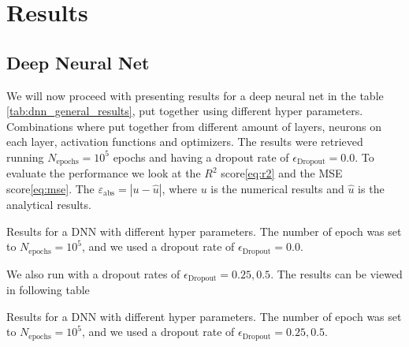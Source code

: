 \section{Results}


\subsection{Deep Neural Net}
We will now proceed with presenting results for a deep neural net in the table \ref{tab:dnn_general_results}, put together using different hyper parameters. Combinations where put together from different amount of layers, neurons on each layer, activation functions and optimizers. The results were retrieved running $N_\mathrm{epochs}=10^5$ epochs and having a dropout rate of $\epsilon_\mathrm{Dropout}=0.0$. To evaluate the performance we look at the $R^2$ score\eqref{eq:r2} and the MSE score\eqref{eq:mse}. The $\varepsilon_{\mathrm{abs}}=|u - \hat{u}|$, where $u$ is the numerical results and $\hat{u}$ is the analytical results.
\begin{table}[h!tb]
    \centering
    \caption{Results for a DNN with different hyper parameters. The number of epoch was set to $N_\mathrm{epochs}=10^5$, and we used a dropout rate of $\epsilon_\mathrm{Dropout}=0.0$. }
    \label{tab:dnn_general_results}
\end{table}

We also run with a dropout rates of $\epsilon_\mathrm{Dropout}=0.25, 0.5$. The results can be viewed in following table
\begin{table}[h!tb]
    \centering
    \caption{Results for a DNN with different hyper parameters. The number of epoch was set to $N_\mathrm{epochs}=10^5$, and we used a dropout rate of $\epsilon_\mathrm{Dropout}=0.25, 0.5$.}
    \label{tab:dnn_dropout_results}
\end{table}

